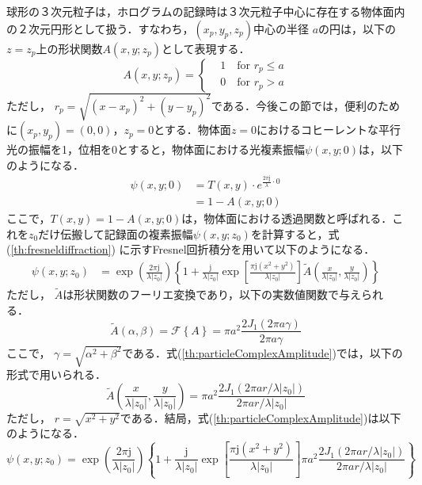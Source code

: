 球形の３次元粒子は，ホログラムの記録時は３次元粒子中心に存在する物体面内の２次元円形として扱う．すなわち，$(x_p,y_p,z_p)$中心の半径 $a$の円は，以下の $z=z_p$上の形状関数$A(x,y;z_p)$として表現する．
\begin{equation}
    \label{th:particleShapeFunction}
    A(x,y;z_p) = \left\{
    \begin{aligned}
        &1 \quad \text{for } r_p \leq a \\
        &0 \quad \text{for } r_p > a
    \end{aligned}
    \right.
\end{equation}
ただし， $r_p=\sqrt{(x-x_p)^2+(y-y_p)^2}$である．今後この節では，便利のために$(x_p,y_p) = (0,0)$，$z_p = 0$とする．物体面$z=0$におけるコヒーレントな平行光の振幅を1，位相を0とすると，物体面における光複素振幅$\psi(x,y;0)$は，以下のようになる．
\begin{align}
    \psi(x,y;0) &= T(x,y)\cdot e^{\frac{2\pi \mathrm{j}}{\lambda}\cdot 0} \\
    &= 1 - A(x,y;0)
\end{align}
ここで，$T(x,y) = 1 - A(x,y;0)$は，物体面における透過関数と呼ばれる．これを$z_0$だけ伝搬して記録面の複素振幅$\psi(x,y;z_0)$を計算すると，式(\ref{th:fresneldiffraction}) に示すFresnel回折積分を用いて以下のようになる\cite{vikram}．
\begin{align}
    \label{th:particleComplexAmplitude}
    \psi(x,y;z_0) &= \exp{\left( \frac{2\pi \mathrm{j}}{\lambda |z_0|} \right)} \left\{  
        1 + \frac{\mathrm{j}}{\lambda |z_0|} \exp{\left[ \frac{\pi \mathrm{j} \left( x^2+y^2 \right)}{\lambda |z_0|}\right] \tilde{A}\left( \frac{x}{\lambda |z_0|}, \frac{y}{\lambda |z_0|} \right) }
     \right\}
\end{align}
ただし， $\tilde{A}$は形状関数のフーリエ変換であり，以下の実数値関数で与えられる．
\begin{equation}
    \label{th:fourierOfA}
    \tilde{A}(\alpha,\beta) = \mathcal{F}\left\{ A \right\} = \pi a^2 \frac{2J_1(2\pi a \gamma)}{2\pi a \gamma}
\end{equation}
ここで， $\gamma = \sqrt{\alpha^2+\beta^2}$である．式(\ref{th:particleComplexAmplitude})では，以下の形式で用いられる．
\begin{equation}
    \label{th:fourierOfA2}
    \tilde{A}\left( \frac{x}{\lambda |z_0|}, \frac{y}{\lambda |z_0|} \right)  =  \pi a^2 \frac{2J_1(2\pi a r/ \lambda |z_0|)}{2\pi a r/ \lambda |z_0|}
\end{equation}
ただし， $r=\sqrt{x^2+y^2}$である．結局，式(\ref{th:particleComplexAmplitude})は以下のようになる．
\begin{equation}
    \label{th:particleComplexAmplitude2}
    \psi(x,y;z_0) = \exp{\left( \frac{2\pi \mathrm{j}}{\lambda |z_0|} \right)} \left\{  
        1 + \frac{\mathrm{j}}{\lambda |z_0|} \exp{\left[ \frac{\pi \mathrm{j} \left( x^2+y^2 \right)}{\lambda |z_0|}\right] \pi a^2 \frac{2J_1(2\pi a r/ \lambda |z_0|)}{2\pi a r/ \lambda |z_0|} }
     \right\}
\end{equation}

